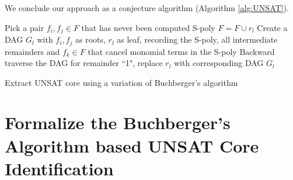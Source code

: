 \begin{figure}[hbt]
\end{figure}

We conclude our approach as a conjecture algorithm (Algorithm \ref{alg:UNSAT}). 

\begin{algorithm}[hbt]
\SetAlgoNoLine
{
	Pick a pair $f_i,f_j\in F$ that has never been computed S-poly\;
	{
		$F = F\cup r_l$\;
		Create a DAG $G_l$ with $f_i,f_j$ as roots, $r_l$ as leaf, recording the S-poly, all intermediate remainders and $f_k\in F$ that cancel monomial terms in the S-poly\;
	}
}
Backward traverse the DAG for remainder ``1", replace $r_l$ with corresponding DAG $G_l$\;
\caption {Extract UNSAT core using a variation of Buchberger's algorithm}\label{alg:UNSAT}
\end{algorithm}

\section{Formalize the Buchberger's Algorithm based UNSAT Core Identification}
\label{sec:core}


